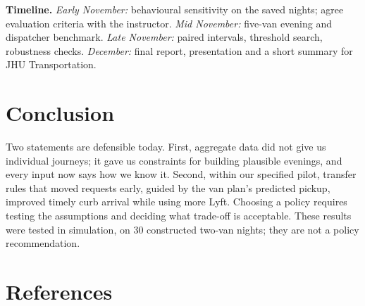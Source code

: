 \documentclass{article}
\begin{document}
\textbf{Timeline.} \emph{Early November:} behavioural sensitivity on the saved nights; agree evaluation criteria with the instructor. \emph{Mid November:} five-van evening and dispatcher benchmark. \emph{Late November:} paired intervals, threshold search, robustness checks. \emph{December:} final report, presentation and a short summary for JHU Transportation.

\section{Conclusion}\label{sec:conclusion}

Two statements are defensible today. First, aggregate data did not give us individual journeys; it gave us constraints for building plausible evenings, and every input now says how we know it. Second, within our specified pilot, transfer rules that moved requests early, guided by the van plan's predicted pickup, improved timely curb arrival while using more Lyft. Choosing a policy requires testing the assumptions and deciding what trade-off is acceptable. These results were tested in simulation, on 30 constructed two-van nights; they are not a policy recommendation.

\section*{References}
\end{document}
